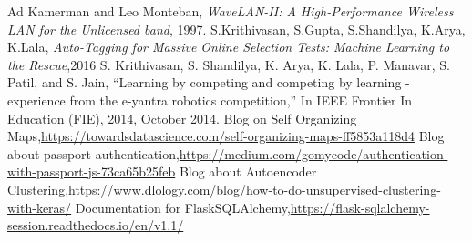 \documentclass[a4paper,12pt,oneside]{book}
\begin{document}
\begin{thebibliography}{li}
Ad Kamerman and Leo Monteban,
{\em WaveLAN-II: A High-Performance Wireless LAN for the Unlicensed band},
1997.
S.Krithivasan, S.Gupta, S.Shandilya, K.Arya, K.Lala, {\em Auto-Tagging for Massive Online Selection Tests: Machine Learning to the Rescue},2016
S. Krithivasan, S. Shandilya, K. Arya, K. Lala, P. Manavar,
S. Patil, and S. Jain, “Learning by competing and competing by
learning - experience from the e-yantra robotics competition,”
In IEEE Frontier In Education (FIE), 2014, October 2014.
Blog on Self Organizing Maps,{\href{https://towardsdatascience.com/self-organizing-maps-ff5853a118d4}{https://towardsdatascience.com/self-organizing-maps-ff5853a118d4}}
Blog about passport authentication,{\href{https://medium.com/gomycode/authentication-with-passport-js-73ca65b25feb}{https://medium.com/gomycode/authentication-with-passport-js-73ca65b25feb}}
Blog about Autoencoder Clustering,{\href{https://www.dlology.com/blog/how-to-do-unsupervised-clustering-with-keras/}{https://www.dlology.com/blog/how-to-do-unsupervised-clustering-with-keras/}}
Documentation for FlaskSQLAlchemy,{\href{https://flask-sqlalchemy-session.readthedocs.io/en/v1.1/}{https://flask-sqlalchemy-session.readthedocs.io/en/v1.1/}}
\end{thebibliography}
\end{document}

